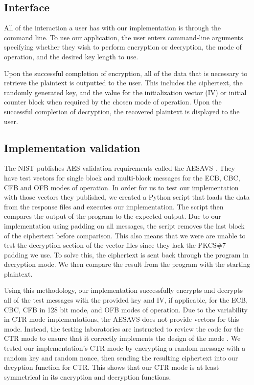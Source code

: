 \documentclass[a4paper,12pt]{article}
\begin{document}
\subsection{Interface}
All of the interaction a user has with our implementation is through the command line. To use our application, the user enters command-line arguments specifying whether they wish to perform encryption or decryption, the mode of operation, and the desired key length to use.

Upon the successful completion of encryption, all of the data that is necessary to retrieve the plaintext is outputted to the user. This includes the ciphertext, the randomly generated key, and the value for the initialization vector (IV) or initial counter block when required by the chosen mode of operation. Upon the successful completion of decryption, the recovered plaintext is displayed to the user.

\subsection{Implementation validation}
The NIST publishes AES validation requirements called the AESAVS \cite{tests}. They have test vectors for single block and multi-block messages for the ECB, CBC, CFB and OFB modes of operation. In order for us to test our implementation with those vectors they published, we created a Python script that loads the data from the response files and executes our implementation. The script then compares the output of the program to the expected output. Due to our implementation using padding on all messages, the script removes the last block of the ciphertext before comparison. This also means that we were are unable to test the decryption section of the vector files since they lack the PKCS\#7 padding we use. To solve this, the ciphertext is sent back through the program in decryption mode. We then compare the result from the program with the starting plaintext.
 
Using this methodology, our implementation successfully encrypts and decrypts all of the test messages with the provided key and IV, if applicable, for the ECB, CBC, CFB in 128 bit mode, and OFB modes of operation. Due to the variability in CTR mode implementations, the AESAVS does not provide vectors for this mode. Instead, the testing laboratories are instructed to review the code for the CTR mode to ensure that it correctly implements the design of the mode \cite{tests}. We tested our implementation's CTR mode by encrypting a random message with a random key and random nonce, then sending the resulting ciphertext into our decyption function for CTR. This shows that our CTR mode is at least symmetrical in its encryption and decryption functions.
\end{document}
